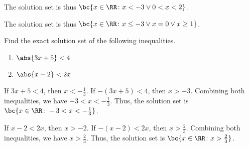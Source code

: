 \begin{solution}
\begin{ppart}
\begin{center}
\begin{tikzpicture}
            \end{tikzpicture}
        \end{center}
        The solution set is thus $\bc{x \in \RR \colon x < -3 \lor 0 < x < 2}$.
    \end{ppart}
    \begin{ppart}
        \begin{center}
        \end{center}
        The solution set is thus $\bc{x \in \RR \colon x \leq -3 \lor x = 0 \lor x \geq 1}$.
    \end{ppart}
\end{solution}

\begin{problem}
    Find the exact solution set of the following inequalities.

    \begin{enumerate}
        \item $\abs{3x+5} < 4$
        \item $\abs{x-2} < 2x$
    \end{enumerate}
\end{problem}
\begin{solution}
    \begin{ppart}
        If $3x + 5 < 4$, then $x < -\frac13$. If $-(3x+5) < 4$, then $x > -3$. Combining both inequalities, we have $-3 < x < -\frac13$. Thus, the solution set is $\bc{x \in \RR \colon -3 < x< -\frac13}$.
    \end{ppart}
    \begin{ppart}
        If $x - 2 < 2x$, then $x > -2$. If $-(x-2) < 2x$, then $x > \frac23$. Combining both inequalities, we have $x > \frac23$. Thus, the solution set is $\bc{x \in \RR \colon x > \frac23}$.
    \end{ppart}
\end{solution}

